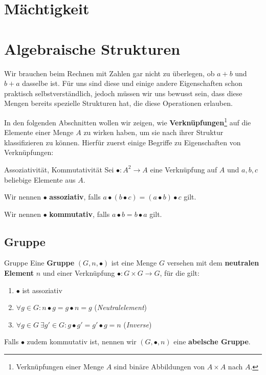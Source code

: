 \section{Mächtigkeit}


\section{Algebraische Strukturen}
Wir brauchen beim Rechnen mit Zahlen gar nicht zu überlegen, ob $a + b$ und $b + a$ dasselbe ist. Für uns sind diese und einige andere Eigenschaften schon praktisch selbstverständlich, jedoch müssen wir uns bewusst sein, dass diese Mengen bereits spezielle Strukturen hat, die diese Operationen erlauben.

In den folgenden Abschnitten wollen wir zeigen, wie \textbf{Verknüpfungen}\footnote{Verknüpfungen einer Menge $A$ sind binäre Abbildungen von $A \times A$ nach $A$.} auf die Elemente einer Menge $A$ zu wirken haben, um sie nach ihrer Struktur klassifizieren zu können. Hierfür zuerst einige Begriffe zu Eigenschaften von Verknüpfungen:

\begin{definition}{Assoziativität, Kommutativität}{}
Sei $\bullet: A^2 \to A$ eine Verknüpfung auf $A$ und $a, b, c$ beliebige Elemente aus $A$.

Wir nennen $\bullet$ \textbf{assoziativ}, falls $a \bullet (b \bullet c) = (a \bullet b) \bullet c$ gilt.

Wir nennen $\bullet$ \textbf{kommutativ}, falls $a \bullet b = b \bullet a$ gilt.
\end{definition}

\subsection{Gruppe}
\begin{definition}{Gruppe}{}
Eine \textbf{Gruppe} $(G, n, \bullet)$ ist eine Menge $G$ versehen mit dem \textbf{neutralen Element} $n$ und einer Verknüpfung $\bullet: G \times G \to G$, für die gilt:
\begin{enumerate}
    \item $\bullet$ ist assoziativ
    \item $\forall g \in G : n \bullet g = g \bullet n = g$ \hfill (\textit{Neutralelement})
    \item $\forall g \in G \ \exists g' \in G : g \bullet g' = g' \bullet g = n$ \hfill (\textit{Inverse})
\end{enumerate}
Falls  $\bullet$ zudem kommutativ ist, nennen wir $(G, \bullet, n)$ eine \textbf{abelsche Gruppe}.
\end{definition}

